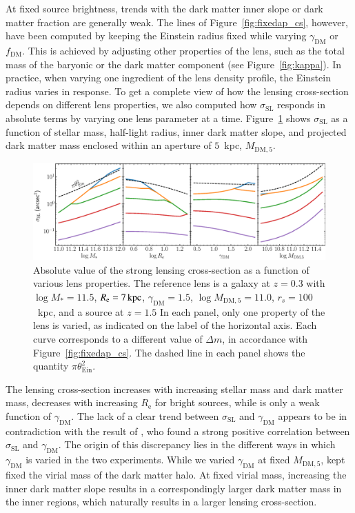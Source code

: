 \documentclass{aa}
\def\reff{R_{\mathrm{e}}}
\def\mstar{M_*}
\def\gammadm{\gamma_{\mathrm{DM}}}
\def\fdm{f_{\mathrm{DM}}}
\def\mdmfive{M_{\mathrm{DM}, 5}}
\def\tein{\theta_{\mathrm{Ein}}}
\def\crosssect{\sigma_\mathrm{{SL}}}
\def\Fref#1{Figure~\ref{#1}\xspace}
\begin{document}
At fixed source brightness, trends with the dark matter inner slope or dark matter fraction are generally weak.
The lines of \Fref{fig:fixedap_cs}, however, have been computed by keeping the Einstein radius fixed while varying $\gammadm$ or $\fdm$.
This is achieved by adjusting other properties of the lens, such as the total mass of the baryonic or the dark matter component (see \Fref{fig:kappa}). 
In practice, when varying one ingredient of the lens density profile, the Einstein radius varies in response.
To get a complete view of how the lensing cross-section depends on different lens properties, we also computed how $\crosssect$ responds in absolute terms by varying one lens parameter at a time.
\Fref{fig:phys_cs} shows $\crosssect$ as a function of stellar mass, half-light radius, inner dark matter slope, and projected dark matter mass enclosed within an aperture of $5$~kpc, $\mdmfive$.

\begin{figure}
\includegraphics[width=\textwidth]{axisymm_composite_physical_crosssect.eps}
\caption{
Absolute value of the strong lensing cross-section as a function of various lens properties.
The reference lens is a galaxy at $z=0.3$ with $\log{\mstar}=11.5$, $\reff=7\,{\rm kpc}$, $\gammadm=1.5$, $\log{\mdmfive}=11.0$, $r_s=100$~kpc, and a source at $z=1.5$
In each panel, only one property of the lens is varied, as indicated on the label of the horizontal axis.
Each curve corresponds to a different value of $\Delta m$, in accordance with \Fref{fig:fixedap_cs}.
The dashed line in each panel shows the quantity $\pi\tein^2$.
\label{fig:phys_cs}
}
\end{figure}

The lensing cross-section increases with increasing stellar mass and dark matter mass, decreases with increasing $\reff$ for bright sources, while is only a weak function of $\gammadm$. 
The lack of a clear trend between $\crosssect$ and $\gammadm$ appears to be in contradiction with the result of \citet{MVK09}, who found a strong positive correlation between $\crosssect$ and $\gammadm$.
The origin of this discrepancy lies in the different ways in which $\gammadm$ is varied in the two experiments. While we varied $\gammadm$ at fixed $\mdmfive$, \citet{MVK09} kept fixed the virial mass of the dark matter halo. At fixed virial mass, increasing the inner dark matter slope results in a correspondingly larger dark matter mass in the inner regions, which naturally results in a larger lensing cross-section.
\end{document}
